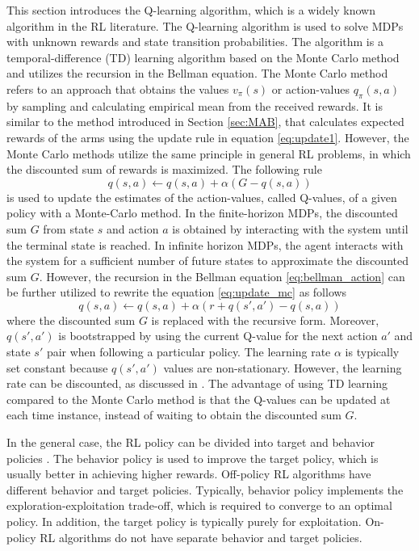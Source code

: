 \documentclass[english, 12pt, a4paper, elec, utf8, a-1b, online]{aaltothesis}
\begin{document}
This section introduces the Q-learning algorithm, which is a widely known algorithm in the RL literature.
The Q-learning algorithm is used to solve MDPs with unknown rewards and state transition probabilities.
The algorithm is a temporal-difference (TD) learning algorithm based on the Monte Carlo method and utilizes the recursion in the Bellman equation.
The Monte Carlo method refers to an approach that obtains the values $v_\pi(s)$ or action-values $q_\pi(s, a)$ by sampling and calculating empirical mean from the received rewards. 
It is similar to the method introduced in Section \ref{sec:MAB}, that calculates expected rewards of the arms using the update rule in equation \eqref{eq:update1}. 
However, the Monte Carlo methods utilize the same principle in general RL problems, in which the discounted sum of rewards is maximized. 
The following rule 
\begin{equation}\label{eq:update_mc}
    q(s, a) \leftarrow q(s, a) + \alpha (G - q(s, a))
\end{equation}
is used to update the estimates of the action-values, called Q-values, of a given policy with a Monte-Carlo method. 
In the finite-horizon MDPs, the discounted sum $G$ from state $s$ and action $a$ is obtained by interacting with the system until the terminal state is reached.   
In infinite horizon MDPs, the agent interacts with the system for a sufficient number of future states to approximate the discounted sum $G$.
However, the recursion in the Bellman equation \eqref{eq:bellman_action} can be further utilized to rewrite the equation \eqref{eq:update_mc} as follows 
\begin{equation}\label{eq:update_td}
    q(s, a) \leftarrow q(s, a) + \alpha \left( r + q(s', a') - q(s, a) \right)
\end{equation}
where the discounted sum $G$ is replaced with the recursive form.
Moreover, $q(s', a')$ is bootstrapped by using the current Q-value for the next action $a'$ and state $s'$ pair when following a particular policy.
The learning rate $\alpha$ is typically set constant because $q(s', a')$ values are non-stationary.
However, the learning rate can be discounted, as discussed in \cite{Even-Dar2003}.
The advantage of using TD learning compared to the Monte Carlo method is that the Q-values can be updated at each time instance, instead of waiting to obtain the discounted sum $G$.

In the general case, the RL policy can be divided into target and behavior policies \cite{Sutton2018}.
The behavior policy is used to improve the target policy, which is usually better in achieving higher rewards.
Off-policy RL algorithms have different behavior and target policies.
Typically, behavior policy implements the exploration-exploitation trade-off, which is required to converge to an optimal policy. 
In addition, the target policy is typically purely for exploitation. 
On-policy RL algorithms do not have separate behavior and target policies. 
\end{document}
